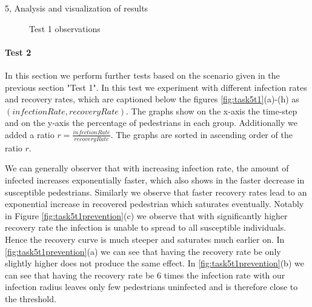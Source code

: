 \begin{task}{5, Analysis and visualization of results}
\begin{figure}[H]
\centering
{}
\caption{Test 1 observations}
\label{fig:task5t1other}
\end{figure}

\paragraph{Test 2}
In this section we perform further tests based on the scenario given in the previous section "Test 1". In this test we experiment with different infection rates and recovery rates, which are captioned below the figures \ref{fig:task5t1}(a)-(h) as $(infectionRate, recoveryRate)$. The graphs show on the x-axis the time-step and on the y-axis the percentage of pedestrians in each group. Additionally we added a ratio $r=\frac{infectionRate}{recoveryRate}$. The graphs are sorted in ascending order of the ratio $r$.

We can generally observer that with increasing infection rate, the amount of infected increases exponentially faster, which also shows in the faster decrease in susceptible pedestrians. Similarly we observe that faster recovery rates lead to an exponential increase in recovered pedestrian which saturates eventually. Notably in Figure \ref{fig:task5t1prevention}(c) we observe that with significantly higher recovery rate the infection is unable to spread to all susceptible individuals. Hence the recovery curve is much steeper and saturates much earlier on. In \ref{fig:task5t1prevention}(a) we can see that having the recovery rate be only slightly higher does not produce the same effect. In \ref{fig:task5t1prevention}(b) we can see that having the recovery rate be 6 times the infection rate with our infection radius leaves only few pedestrians uninfected and is therefore close to the threshold.


\end{task}
